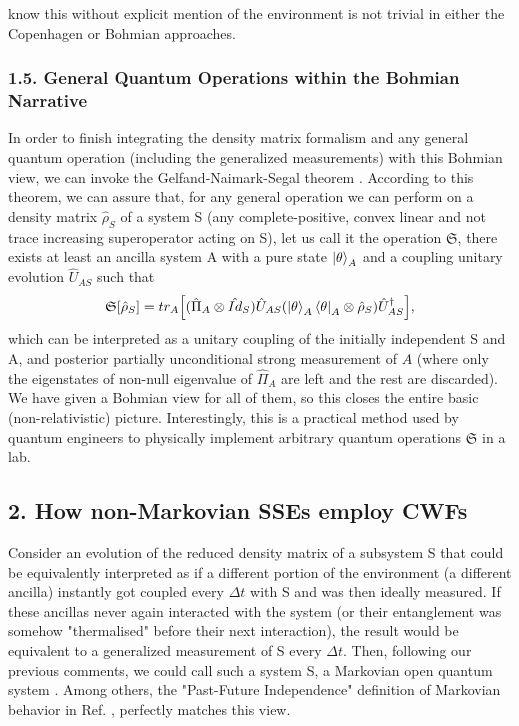 \documentclass[11pt, a4paper]{article} %
\begin{document}
know this without explicit mention of the environment is not trivial in either the Copenhagen or Bohmian approaches.\vspace{-0.25cm}

\subsubsection*{1.5. General Quantum Operations within the Bohmian Narrative}\vspace{-0.2cm}

In order to finish integrating the density matrix formalism and any general quantum operation (including the generalized measurements) with this Bohmian view, we can invoke the Gelfand-Naimark-Segal theorem \cite{GNSTheorem, Generalized}. According to this theorem, we can assure that, for any general operation we can perform on a density matrix $\hat{\rho}_S$ of a system S (any complete-positive, convex linear and not trace increasing superoperator acting on S), let us call it the operation $\mathfrak{S}$, there exists at least an ancilla system A with a pure state $\ket{\theta}_A$ and a coupling unitary evolution $\hat{U}_{AS}$ such that\vspace{-0.15cm}
\begin{equation}
\mathfrak{S}[\hat{\rho}_S]=tr_A\qty[ (\hat{\Pi}_A\otimes \hat{Id}_S)  \hat{U}_{AS}\qty(\ket{\theta}_A\bra{\theta}_A\otimes \hat{\rho}_S)\hat{U}_{AS}^\dagger],
\end{equation}
which can be interpreted as a unitary coupling of the initially independent S and A, and posterior partially unconditional strong measurement of $A$ (where only the eigenstates of non-null eigenvalue of $\hat{\Pi}_A$ are left and the rest are discarded). We have given a Bohmian view for all of them, so this closes the entire basic (non-relativistic) picture. Interestingly, this is a practical method used by quantum engineers to physically implement arbitrary quantum operations $\mathfrak{S}$ in a lab.\vspace{-0.2cm}


\subsection*{2. How non-Markovian SSEs employ CWFs}
Consider an evolution of the reduced density matrix of a subsystem S that could be equivalently interpreted as if a different portion of the environment (a different ancilla) instantly got coupled every $\Delta t$ with S and was then ideally measured. If these ancillas never again interacted with the system (or their entanglement was somehow "thermalised" before their next interaction), the result would be equivalent to a generalized measurement of S every $\Delta t$. Then, following our previous comments, we could call such a system S, a Markovian open quantum system \cite{QuantumTrajs}. Among others, the "Past-Future Independence" definition of Markovian behavior in Ref. \cite{MarkovianityDefs}, perfectly matches this view.
\end{document}
